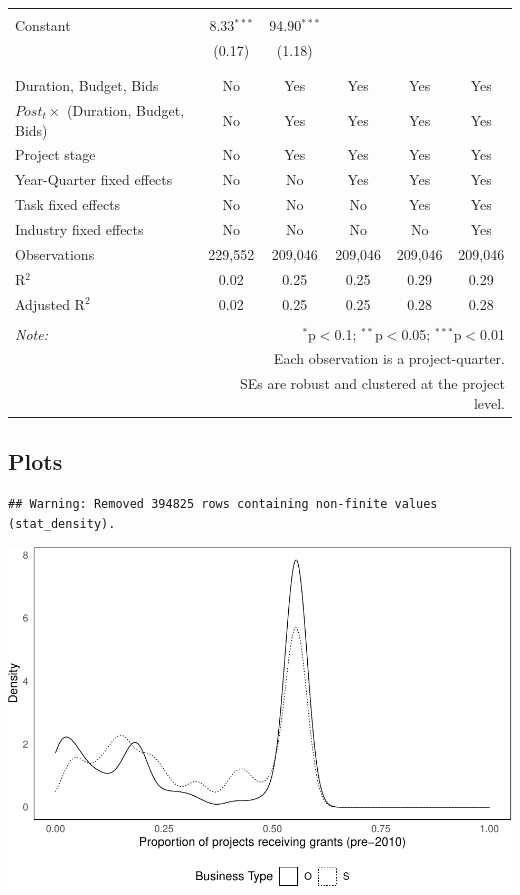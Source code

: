 \documentclass[
]{article}
\begin{document}
\begin{table}[H]
\begin{tabular}{@{\extracolsep{-2pt}}lccccc}
  & & & & & \\ 
 Constant & 8.33$^{***}$ & 94.90$^{***}$ &  &  &  \\ 
  & (0.17) & (1.18) &  &  &  \\ 
  & & & & & \\ 
\hline \\[-1.8ex] 
Duration, Budget, Bids & No & Yes & Yes & Yes & Yes \\ 
$Post_t \times $  (Duration, Budget, Bids) & No & Yes & Yes & Yes & Yes \\ 
Project stage & No & Yes & Yes & Yes & Yes \\ 
Year-Quarter fixed effects & No & No & Yes & Yes & Yes \\ 
Task fixed effects & No & No & No & Yes & Yes \\ 
Industry fixed effects & No & No & No & No & Yes \\ 
Observations & 229,552 & 209,046 & 209,046 & 209,046 & 209,046 \\ 
R$^{2}$ & 0.02 & 0.25 & 0.25 & 0.29 & 0.29 \\ 
Adjusted R$^{2}$ & 0.02 & 0.25 & 0.25 & 0.28 & 0.28 \\ 
\hline 
\hline \\[-1.8ex] 
\textit{Note:}  & \multicolumn{5}{r}{$^{*}$p$<$0.1; $^{**}$p$<$0.05; $^{***}$p$<$0.01} \\ 
 & \multicolumn{5}{r}{Each observation is a project-quarter.} \\ 
 & \multicolumn{5}{r}{SEs are robust and clustered at the project level.} \\ 
\end{tabular} 
\end{table}

\hypertarget{plots-1}{%
\subsection{Plots}\label{plots-1}}

\begin{verbatim}
## Warning: Removed 394825 rows containing non-finite values (stat_density).
\end{verbatim}

\includegraphics{qp_first_pc_delay-2_files/figure-latex/grants_plots-1.pdf}
\end{document}
